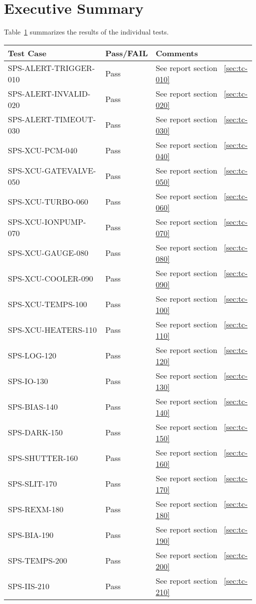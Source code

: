 \section{Executive Summary}

Table~\ref{tab:summary-table} summarizes the results of the individual tests.

\begin{table}[H]
    \begin{tabular}{|p{6cm}|l| p{7cm} | }
    \hline
    {\bf Test Case} & {\bf Pass/FAIL} & {\bf Comments} \\ \hline
    SPS-ALERT-TRIGGER-010 & Pass & See report section ~\ref{sec:tc-010} \\ \hline
    SPS-ALERT-INVALID-020 & Pass & See report section ~\ref{sec:tc-020} \\ \hline
    SPS-ALERT-TIMEOUT-030 & Pass & See report section ~\ref{sec:tc-030} \\ \hline
    SPS-XCU-PCM-040 & Pass & See report section ~\ref{sec:tc-040} \\ \hline
    SPS-XCU-GATEVALVE-050 & Pass & See report section ~\ref{sec:tc-050} \\ \hline
    SPS-XCU-TURBO-060 & Pass & See report section ~\ref{sec:tc-060} \\ \hline
    SPS-XCU-IONPUMP-070 & Pass & See report section ~\ref{sec:tc-070} \\ \hline
    SPS-XCU-GAUGE-080 & Pass & See report section ~\ref{sec:tc-080} \\ \hline
    SPS-XCU-COOLER-090 & Pass & See report section ~\ref{sec:tc-090} \\ \hline
    SPS-XCU-TEMPS-100 & Pass & See report section ~\ref{sec:tc-100} \\ \hline
    SPS-XCU-HEATERS-110 & Pass & See report section ~\ref{sec:tc-110} \\ \hline
    SPS-LOG-120 & Pass & See report section ~\ref{sec:tc-120} \\ \hline
    SPS-IO-130 & Pass & See report section ~\ref{sec:tc-130} \\ \hline
    SPS-BIAS-140 & Pass & See report section ~\ref{sec:tc-140} \\ \hline
    SPS-DARK-150 & Pass & See report section ~\ref{sec:tc-150} \\ \hline
    SPS-SHUTTER-160 & Pass & See report section ~\ref{sec:tc-160} \\ \hline
    SPS-SLIT-170 & Pass & See report section ~\ref{sec:tc-170} \\ \hline
    SPS-REXM-180 & Pass & See report section ~\ref{sec:tc-180} \\ \hline
    SPS-BIA-190 & Pass & See report section ~\ref{sec:tc-190} \\ \hline
    SPS-TEMPS-200 & Pass & See report section ~\ref{sec:tc-200} \\ \hline
    SPS-IIS-210 & Pass & See report section ~\ref{sec:tc-210} \\ \hline

    \end{tabular}
\label{tab:summary-table}
\end{table}

